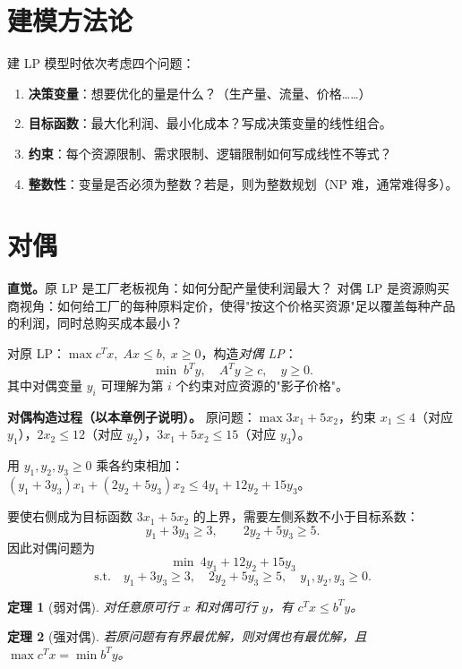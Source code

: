 \documentclass[UTF8,openany,12pt]{ctexbook}
\newtheorem{theorem}{定理}[chapter]
\theoremstyle{remark}
\begin{document}
\section{建模方法论}

建 LP 模型时依次考虑四个问题：
\begin{enumerate}
  \item \textbf{决策变量}：想要优化的量是什么？（生产量、流量、价格……）
  \item \textbf{目标函数}：最大化利润、最小化成本？写成决策变量的线性组合。
  \item \textbf{约束}：每个资源限制、需求限制、逻辑限制如何写成线性不等式？
  \item \textbf{整数性}：变量是否必须为整数？若是，则为整数规划（NP 难，通常难得多）。
\end{enumerate}

\section{对偶}

\noindent\textbf{直觉。}原 LP 是工厂老板视角：如何分配产量使利润最大？
对偶 LP 是资源购买商视角：如何给工厂的每种原料定价，使得"按这个价格买资源"足以覆盖每种产品的利润，同时总购买成本最小？

\noindent 对原 LP：$\max c^Tx,\;Ax\le b,\;x\ge0$，构造\emph{对偶 LP}：
\[
  \min\; b^Ty,\quad A^Ty\ge c,\quad y\ge 0.
\]
其中对偶变量 $y_i$ 可理解为第 $i$ 个约束对应资源的"影子价格"。

\noindent\textbf{对偶构造过程（以本章例子说明）。}
原问题：$\max 3x_1+5x_2$，约束 $x_1\le4$（对应 $y_1$），$2x_2\le12$（对应 $y_2$），$3x_1+5x_2\le15$（对应 $y_3$）。

用 $y_1,y_2,y_3\ge0$ 乘各约束相加：
$(y_1+3y_3)x_1+(2y_2+5y_3)x_2\le 4y_1+12y_2+15y_3$。

要使右侧成为目标函数 $3x_1+5x_2$ 的上界，需要左侧系数不小于目标系数：
\[
  y_1+3y_3\ge3,\qquad 2y_2+5y_3\ge5.
\]
因此对偶问题为
\[
  \min\ 4y_1+12y_2+15y_3
\]
\[
  \text{s.t.}\quad
  y_1+3y_3\ge3,\quad
  2y_2+5y_3\ge5,\quad
  y_1,y_2,y_3\ge0.
\]

\begin{theorem}[弱对偶]
对任意原可行 $x$ 和对偶可行 $y$，有 $c^Tx\le b^Ty$。
\end{theorem}

\begin{theorem}[强对偶]
若原问题有有界最优解，则对偶也有最优解，且 $\max c^Tx=\min b^Ty$。
\end{theorem}
\end{document}
